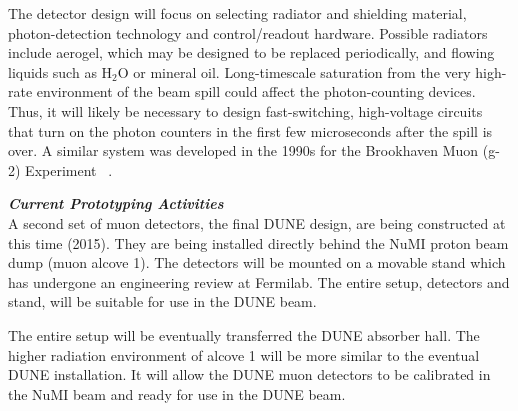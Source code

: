 The detector design will focus on selecting radiator and shielding
material, photon-detection technology and control/readout
hardware. Possible radiators include aerogel, which may be designed to
be replaced periodically, and flowing liquids such as H$_2$O or
mineral oil. Long-timescale saturation from the very high-rate
environment of the beam spill could affect the photon-counting
devices\cite{ref:HighRateCounting}. Thus, it will likely be necessary
to design fast-switching, high-voltage circuits that turn on the
photon counters in the first few microseconds after the spill is
over. A similar system was developed in the 1990s for the Brookhaven
Muon (g-2) Experiment~\cite{ref:G2} .

\textbf{ \textit{Current Prototyping Activities}} \\
A second set of muon detectors, the final DUNE design, are being
constructed at this time (2015). They are being installed directly
behind the NuMI proton beam dump (muon alcove 1). The detectors will
be mounted on a movable stand which has undergone an engineering
review at Fermilab. The entire setup, detectors and stand, will be
suitable for use in the DUNE beam.

The entire setup will be eventually transferred the DUNE absorber
hall. The higher radiation environment of alcove 1 will be more
similar to the eventual DUNE installation. It will allow the DUNE muon
detectors to be calibrated in the NuMI beam and ready for use in the
DUNE beam.


